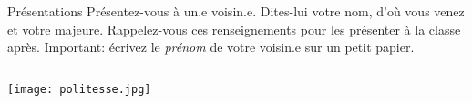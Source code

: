 \begin{frame}{Présentations}
  Présentez-vous à un.e voisin.e.
  Dites-lui votre \alert{nom}, d'\alert{où} vous venez et votre \alert{majeure}.
  Rappelez-vous ces renseignements pour les présenter à la classe après.
  \alert{Important}: écrivez le \emph{prénom} de votre voisin.e sur un petit papier.
  \begin{columns}
      \begin{center}
        \texttt{[image: politesse.jpg]}
      \end{center}
  \end{columns}
\end{frame}
